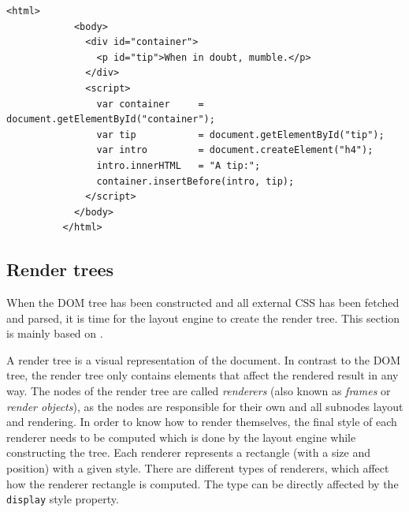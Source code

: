 \documentclass[a4paper,11pt]{kth-mag}
\newcommand{\code}[1]{\texttt{#1}}
\begin{document}
        \begin{lstlisting}[gobble=10,caption={Simple example of reentrant HTML. The \gls{layout engine} needs to reconstruct the \gls{DOM} tree after executing the \gls{JavaScript}. The page will not be rendered until all \gls{JavaScript} has been executed.}, captionpos=b, label={code:reentrant-html}]
          <html>
            <body>
              <div id="container">
                <p id="tip">When in doubt, mumble.</p>
              </div>
              <script>
                var container     = document.getElementById("container");
                var tip           = document.getElementById("tip");
                var intro         = document.createElement("h4");
                intro.innerHTML   = "A tip:";
                container.insertBefore(intro, tip);
              </script>
            </body>
          </html>
        \end{lstlisting}


      \subsection{Render trees}\label{sec:render-tree}
        When the \gls{DOM} tree has been constructed and all external \gls{CSS} has been fetched and parsed, it is time for the \gls{layout engine} to create the \gls{render tree}.
        This section is mainly based on .

        A \gls{render tree} is a visual representation of the \gls{document}.
        In contrast to the \gls{DOM} tree, the \gls{render tree} only contains \glspl{element} that affect the rendered result in any way.
        The nodes of the \gls{render tree} are called \emph{renderers} (also known as \emph{frames} or \emph{render objects}), as the nodes are responsible for their own and all subnodes layout and rendering.
        In order to know how to render themselves, the final style of each renderer needs to be computed which is done by the \gls{layout engine} while constructing the tree.
        Each renderer represents a rectangle (with a size and position) with a given style.
        There are different types of renderers, which affect how the renderer rectangle is computed.
        The type can be directly affected by the \code{display} style property.
\end{document}
